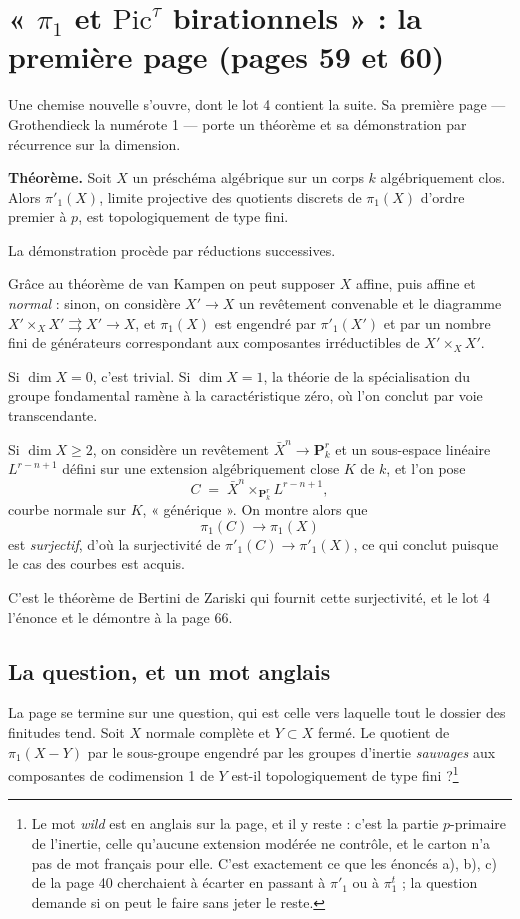 \documentclass[11pt,a4paper]{article}
\begin{document}
\section*{« $\pi_{1}$ et $\mathrm{Pic}^{\tau}$ birationnels » : la première page (pages 59 et 60)}

Une chemise nouvelle s'ouvre, dont le lot 4 contient la suite. Sa première
page --- Grothendieck la numérote 1 --- porte un théorème et sa démonstration
par récurrence sur la dimension.

\textbf{Théorème.} Soit $X$ un préschéma algébrique sur un corps $k$
algébriquement clos. Alors $\pi'_{1}(X)$, limite projective des quotients
discrets de $\pi_{1}(X)$ d'ordre premier à $p$, est topologiquement de type
fini.

La démonstration procède par réductions successives.

Grâce au théorème de van Kampen on peut supposer $X$ affine, puis affine et
\emph{normal} : sinon, on considère $X' \to X$ un revêtement convenable et le
diagramme $X' \times_{X} X' \rightrightarrows X' \to X$, et $\pi_{1}(X)$ est
engendré par $\pi'_{1}(X')$ et par un nombre fini de générateurs correspondant
aux composantes irréductibles de $X' \times_{X} X'$.

Si $\dim X = 0$, c'est trivial. Si $\dim X = 1$, la théorie de la
spécialisation du groupe fondamental ramène à la caractéristique zéro, où l'on
conclut par voie transcendante.

Si $\dim X \geqslant 2$, on considère un revêtement
$\bar{X}^{n} \to \mathbf{P}^{r}_{k}$ et un sous-espace linéaire $L^{r-n+1}$
défini sur une extension algébriquement close $K$ de $k$, et l'on pose
\[
  C \;=\; \bar{X}^{n} \times_{\mathbf{P}^{r}_{k}} L^{r-n+1} ,
\]
courbe normale sur $K$, « générique ». On montre alors que
\[
  \pi_{1}(C) \longrightarrow \pi_{1}(X)
\]
est \emph{surjectif}, d'où la surjectivité de $\pi'_{1}(C) \to \pi'_{1}(X)$, ce
qui conclut puisque le cas des courbes est acquis.

C'est le théorème de Bertini de Zariski qui fournit cette surjectivité, et le
lot 4 l'énonce et le démontre à la page 66.

\subsection*{La question, et un mot anglais}

La page se termine sur une question, qui est celle vers laquelle tout le
dossier des finitudes tend. Soit $X$ normale complète et $Y \subset X$ fermé.
Le quotient de $\pi_{1}(X - Y)$ par le sous-groupe engendré par les groupes
d'inertie \emph{sauvages} aux composantes de codimension 1 de $Y$ est-il
topologiquement de type fini ?\footnote{Le mot \emph{wild} est en anglais sur
la page, et il y reste : c'est la partie $p$-primaire de l'inertie, celle
qu'aucune extension modérée ne contrôle, et le carton n'a pas de mot français
pour elle. C'est exactement ce que les énoncés a), b), c) de la page 40
cherchaient à écarter en passant à $\pi'_{1}$ ou à $\pi^{t}_{1}$ ; la question
demande si on peut le faire sans jeter le reste.}
\end{document}
